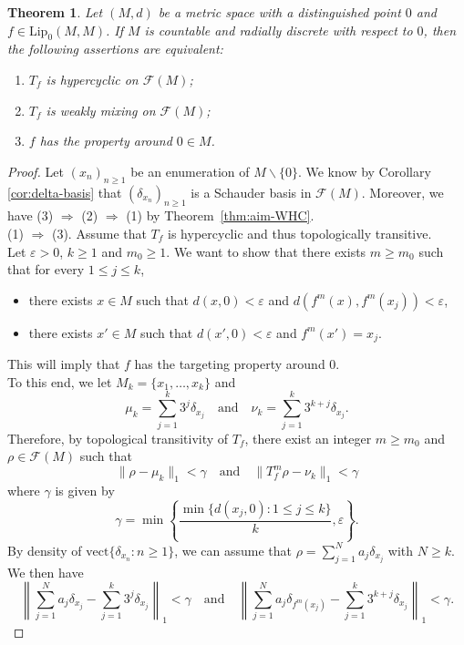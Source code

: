 \documentclass[12pt,english]{amsart}
\numberwithin{equation}{section}
\theoremstyle{plain}
\newtheorem{theorem}{Theorem}[section]
\theoremstyle{definition}
\def\aim{\text{targeting}{}}
\newcommand{\free}[1]{\mathcal{F}(#1)}
\begin{document}
\begin{theorem}\label{hypdeltas}
Let $(M,d)$ be a metric space with a distinguished point $0$ and $f\in \text{Lip}_0(M,M)$. If $M$ is countable and radially discrete with respect to $0$, then the following assertions are equivalent:
\begin{enumerate}
\item $T_f$ is hypercyclic on $\free{M}$;
\item $T_f$ is weakly mixing on $\free{M}$;
\item $f$ has the \aim{} property around $0\in M$.
\end{enumerate}
\end{theorem}
\begin{proof}
Let $(x_n)_{n\geq1}$ be an enumeration of $M\backslash\{0\}$. We know by Corollary \ref{cor:delta-basis} that $(\delta_{x_n})_{n\geq1}$ is a Schauder basis in $\free{M}$.
Moreover, we have (3) $\Rightarrow$ (2) $\Rightarrow$ (1) by Theorem~\ref{thm:aim-WHC}.\\


(1) $\Rightarrow$ (3). Assume that $T_f$ is hypercyclic and thus topologically transitive.\\


Let $\varepsilon>0$, $k\ge 1$ and $m_0\ge 1$. We want to show that there exists $m\ge m_0$ such that for every $1\le j\le k$, 
\begin{itemize}
\item there exists $x\in M$ such that $d(x,0)<\varepsilon$  and $d(f^m(x),f^m(x_j))<\varepsilon$,
\item there exists $x'\in M$ such that $d(x',0)<\varepsilon$ and $f^m(x')=x_j$.
\end{itemize}
This will imply that $f$ has the targeting property around $0$.\\

To this end, we let $M_k=\{x_1,\dots,x_k\}$ and
\[\mu_k=\sum_{j=1}^k 3^j\delta_{x_j} \quad \text{and}\quad \nu_k=\sum_{j=1}^k 3^{k+j}\delta_{x_j}.\]
Therefore, by topological transitivity of $T_f$, there exist an integer $m\ge m_0$ and $\rho\in \mathcal{F}(M)$ such that 
\[\|\rho-\mu_k\|_1<\gamma \quad \text{and}\quad \|T_f^m\rho-\nu_k\|_1<\gamma\]
where $\gamma$ is given by
\[\gamma=\min\left\{\frac{\min\{d(x_j,0):1\le j\le k\}}{k},\varepsilon\right\}.\]
By density of $\text{vect}\{\delta_{x_n}: n\ge 1\}$, we can assume that $\rho=\sum_{j=1}^N a_j \delta_{x_j}$ with $N\ge k$. We then have
\[\left\|\sum_{j=1}^N a_j \delta_{x_j}-\sum_{j=1}^k 3^j\delta_{x_j}\right\|_1<\gamma \quad \text{and}\quad  \left\|\sum_{j=1}^N a_j \delta_{f^m(x_j)}-\sum_{j=1}^k 3^{k+j}\delta_{x_j}\right\|_1<\gamma.\]


\end{proof}
\end{document}

